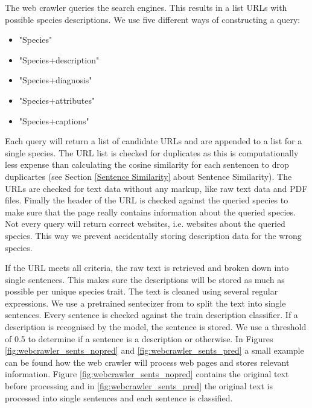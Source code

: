 \documentclass[a4paper, 12pt, oneside]{book} %
\begin{document}
The web crawler queries the search engines. 
This results in a list URLs with possible species descriptions.
We use five different ways of constructing a query:
\begin{itemize}
    \item "Species"
    \item "Species+description"
    \item "Species+diagnosis"
    \item "Species+attributes"
    \item "Species+captions"
\end{itemize}
Each query will return a list of candidate URLs and are appended to a list for a single species.
The URL list is checked for duplicates as this is computationally less expense than calculating the cosine similarity for each sentencen to drop duplicartes (see Section \ref{Sentence Similarity} about Sentence Similarity).
The URLs are checked for text data without any markup, like raw text data and PDF files.
Finally the header of the URL is checked against the queried species to make sure that the page really contains information about the queried species.
Not every query will return correct websites, i.e. websites about the queried species.
This way we prevent accidentally storing description data for the wrong species.

If the URL meets all criteria, the raw text is retrieved and broken down into single sentences. 
This makes sure the descriptions will be stored as much as possible per unique species trait.
The text is cleaned using several regular expressions. %
We use a pretrained sentecizer from \textcite{wolf_huggingfaces_2020} to split the text into single sentences.
Every sentence is checked against the train description classifier.
If a description is recognised by the model, the sentence is stored.
We use a threshold of 0.5 to determine if a sentence is a description or otherwise.
In Figures \ref{fig:webcrawler_sents_nopred} and \ref{fig:webcrawler_sents_pred} a small example can be found how the web crawler will process web pages and stores relevant information. 
Figure \ref{fig:webcrawler_sents_nopred} contains the original text before processing and in \ref{fig:webcrawler_sents_pred} the original text is processed into single sentences and each sentence is classified.
\end{document}
